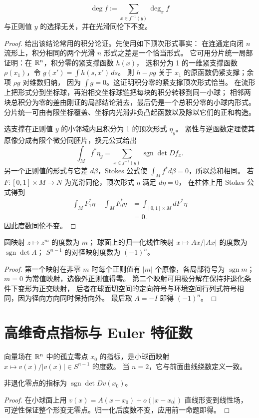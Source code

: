 \begin{theorem}[度数不依赖正则值]
\[
 \deg f:=\sum_{x\in f^{-1}(y)}\deg_x f
\]
与正则值 $y$ 的选择无关，并在光滑同伦下不变。
\end{theorem}
\begin{proof}
给出该结论常用的积分论证。先使用如下顶次形式事实：
在连通定向闭 $n$ 流形上，积分相同的两个光滑 $n$ 形式之差是一个恰当形式。
它可用分片统一局部证明：在 $\mathbb{R}^n$，积分零的紧支撑函数 $h(x)$，
选积分为 1 的一维紧支撑函数 $\rho(x_1)$，令
$g(x')=\displaystyle\int h(s,x')\,ds$。
则 $h-\rho g$ 关于 $x_1$ 的原函数仍紧支撑；余项 $\rho g$ 对维数归纳，
因为 $\displaystyle\int g=0$。这证明积分零的紧支撑顶次形式恰当。
在流形上把形式分到坐标球，再沿相交坐标球链把每块的积分转移到同一小球；
相邻两块总积分为零的差由刚证的局部结论消去，最后仍是一个总积分零的小球内形式。
分片统一可由有限坐标覆盖、坐标内光滑非负凸起函数以及除以它们的正和构造。

选支撑在正则值 $y$ 的小邻域内且积分为 1 的顶次形式 $\eta_y$。
紧性与逆函数定理使其原像分成有限个微分同胚片，换元公式给出
\[
 \int_M f^*\eta_y=\sum_{x\in f^{-1}(y)}\operatorname{sgn}\det Df_x.
\]
另一个正则值的形式与它差 $d\beta$，Stokes 公式使
$\displaystyle\int_M f^*d\beta=0$，所以总和相同。
若 $F:[0,1]\times M\to N$ 为光滑同伦，顶次形式 $\eta$ 满足 $d\eta=0$，
在柱体上用 Stokes 公式得到
\[
 \begin{aligned}
 \int_MF_1^*\eta-\int_MF_0^*\eta
 &=\int_{[0,1]\times M}dF^*\eta\\
 &=0.
\end{aligned}
\]
因此度数同伦不变。
\end{proof}
\begin{proposition}
圆映射 $z\mapsto z^m$ 的度数为 $m$；
球面上的归一化线性映射 $x\mapsto Ax/|Ax|$ 的度数为 $\operatorname{sgn}\det A$；
$S^{n-1}$ 的对径映射度数为 $(-1)^n$。
\end{proposition}
\begin{proof}
第一个映射在非零 $m$ 时每个正则值有 $|m|$ 个原像，各局部符号为 $\operatorname{sgn}m$；
$m=0$ 为常值映射，选像外正则值得零。
第二个映射可用极分解在保持非退化条件下变形为正交映射，
后者在球面切空间的定向符号与环境空间行列式符号相同，因为径向方向同时保持向外。
最后取 $A=-I$ 即得 $(-1)^n$。
\end{proof}

\section{高维奇点指标与 Euler 特征数}
\begin{definition}
向量场在 $\mathbb{R}^n$ 中的孤立零点 $x_0$ 的指标，是小球面映射
$x\mapsto v(x)/|v(x)|\in S^{n-1}$ 的度数。
当 $n=2$，它与前面曲线绕数定义一致。
\end{definition}
\begin{proposition}
非退化零点的指标为 $\operatorname{sgn}\det Dv(x_0)$。
\end{proposition}
\begin{proof}
在小球面上用 $v(x)=A(x-x_0)+o(|x-x_0|)$ 直线形变到线性场，
可逆性保证整个形变无零点。归一化后度数不变，应用前一命题即得。
\end{proof}


